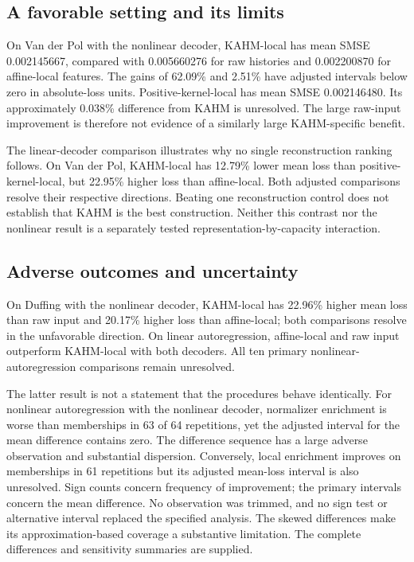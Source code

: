 \subsection{A favorable setting and its limits}
On Van der Pol with the nonlinear decoder, KAHM-local has mean SMSE 0.002145667, compared with 0.005660276 for raw histories and 0.002200870 for affine-local features. The gains of 62.09\% and 2.51\% have adjusted intervals below zero in absolute-loss units. Positive-kernel-local has mean SMSE 0.002146480. Its approximately 0.038\% difference from KAHM is unresolved. The large raw-input improvement is therefore not evidence of a similarly large KAHM-specific benefit.

The linear-decoder comparison illustrates why no single reconstruction ranking follows. On Van der Pol, KAHM-local has 12.79\% lower mean loss than positive-kernel-local, but 22.95\% higher loss than affine-local. Both adjusted comparisons resolve their respective directions. Beating one reconstruction control does not establish that KAHM is the best construction. Neither this contrast nor the nonlinear result is a separately tested representation-by-capacity interaction.

\subsection{Adverse outcomes and uncertainty}
On Duffing with the nonlinear decoder, KAHM-local has 22.96\% higher mean loss than raw input and 20.17\% higher loss than affine-local; both comparisons resolve in the unfavorable direction. On linear autoregression, affine-local and raw input outperform KAHM-local with both decoders. All ten primary nonlinear-autoregression comparisons remain unresolved.

The latter result is not a statement that the procedures behave identically. For nonlinear autoregression with the nonlinear decoder, normalizer enrichment is worse than memberships in 63 of 64 repetitions, yet the adjusted interval for the mean difference contains zero. The difference sequence has a large adverse observation and substantial dispersion. Conversely, local enrichment improves on memberships in 61 repetitions but its adjusted mean-loss interval is also unresolved. Sign counts concern frequency of improvement; the primary intervals concern the mean difference. No observation was trimmed, and no sign test or alternative interval replaced the specified analysis. The skewed differences make its approximation-based coverage a substantive limitation. The complete differences and sensitivity summaries are supplied.

